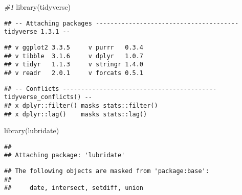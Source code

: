 \documentclass[
]{article}
\newenvironment{Shaded}{\begin{snugshade}}{\end{snugshade}}
\newcommand{\AttributeTok}[1]{\textcolor[rgb]{0.77,0.63,0.00}{#1}}
\newcommand{\CommentTok}[1]{\textcolor[rgb]{0.56,0.35,0.01}{\textit{#1}}}
\newcommand{\ConstantTok}[1]{\textcolor[rgb]{0.00,0.00,0.00}{#1}}
\newcommand{\DecValTok}[1]{\textcolor[rgb]{0.00,0.00,0.81}{#1}}
\newcommand{\FunctionTok}[1]{\textcolor[rgb]{0.00,0.00,0.00}{#1}}
\newcommand{\NormalTok}[1]{#1}
\newcommand{\OtherTok}[1]{\textcolor[rgb]{0.56,0.35,0.01}{#1}}
\newcommand{\SpecialCharTok}[1]{\textcolor[rgb]{0.00,0.00,0.00}{#1}}
\newcommand{\StringTok}[1]{\textcolor[rgb]{0.31,0.60,0.02}{#1}}
\begin{document}
\begin{Shaded}
\begin{Highlighting}[]
\CommentTok{\#1}
\FunctionTok{library}\NormalTok{(tidyverse)}
\end{Highlighting}
\end{Shaded}

\begin{verbatim}
## -- Attaching packages --------------------------------------- tidyverse 1.3.1 --
\end{verbatim}

\begin{verbatim}
## v ggplot2 3.3.5     v purrr   0.3.4
## v tibble  3.1.6     v dplyr   1.0.7
## v tidyr   1.1.3     v stringr 1.4.0
## v readr   2.0.1     v forcats 0.5.1
\end{verbatim}

\begin{verbatim}
## -- Conflicts ------------------------------------------ tidyverse_conflicts() --
## x dplyr::filter() masks stats::filter()
## x dplyr::lag()    masks stats::lag()
\end{verbatim}

\begin{Shaded}
\begin{Highlighting}[]
\FunctionTok{library}\NormalTok{(lubridate)}
\end{Highlighting}
\end{Shaded}

\begin{verbatim}
## 
## Attaching package: 'lubridate'
\end{verbatim}

\begin{verbatim}
## The following objects are masked from 'package:base':
## 
##     date, intersect, setdiff, union
\end{verbatim}

\begin{Shaded}
\end{Shaded}
\end{document}
